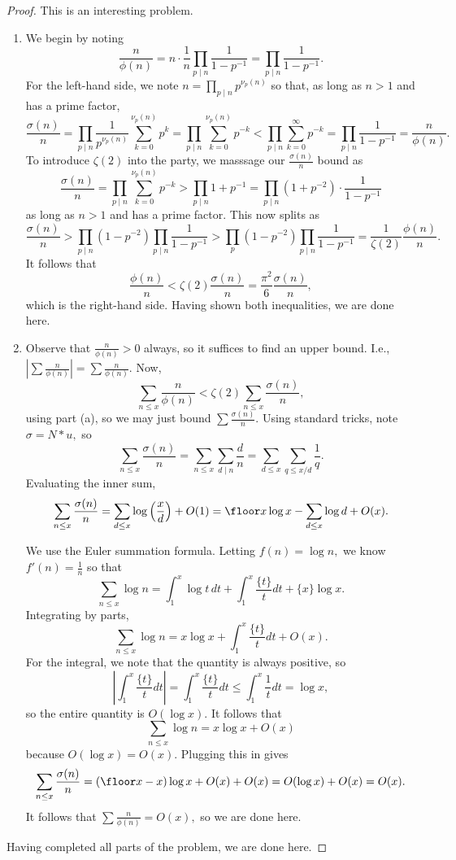 \begin{proof}
This is an interesting problem.
\begin{enumerate}[label=(\alph*)]
    \item We begin by noting
    \[\frac n{\phi(n)}=n\cdot\frac1n\prod_{p\mid n}\frac1{1-p^{-1}}=\prod_{p\mid n}\frac1{1-p^{-1}}.\]
    For the left-hand side, we note $n=\prod_{p\mid n}p^{\nu_p(n)}$ so that, as long as $n>1$ and has a prime factor,
    \[\frac{\sigma(n)}n=\prod_{p\mid n}\frac1{p^{\nu_p(n)}}\sum_{k=0}^{\nu_p(n)}p^k=\prod_{p\mid n}\sum_{k=0}^{\nu_p(n)}p^{-k}<\prod_{p\mid n}\sum_{k=0}^\infty p^{-k}=\prod_{p\mid n}\frac1{1-p^{-1}}=\frac n{\phi(n)}.\]
    To introduce $\zeta(2)$ into the party, we masssage our $\frac{\sigma(n)}n$ bound as
    \[\frac{\sigma(n)}n=\prod_{p\mid n}\sum_{k=0}^{\nu_p(n)}p^{-k}>\prod_{p\mid n}1+p^{-1}=\prod_{p\mid n}\left(1+p^{-2}\right)\cdot\frac1{1-p^{-1}}\]
    as long as $n>1$ and has a prime factor. This now splits as
    \[\frac{\sigma(n)}n>\prod_{p\mid n}\left(1-p^{-2}\right)\prod_{p\mid n}\frac1{1-p^{-1}}>\prod_p\left(1-p^{-2}\right)\prod_{p\mid n}\frac1{1-p^{-1}}=\frac1{\zeta(2)}\frac{\phi(n)}n.\]
    It follows that
    \[\frac{\phi(n)}n<\zeta(2)\frac{\sigma(n)}n=\frac{\pi^2}6\frac{\sigma(n)}n,\]
    which is the right-hand side. Having shown both inequalities, we are done here.
    \item Observe that $\frac n{\phi(n)}>0$ always, so it suffices to find an upper bound. I.e., $\left|\sum\frac n{\phi(n)}\right|=\sum\frac n{\phi(n)}.$ Now,
    \[\sum_{n\le x}\frac n{\phi(n)}<\zeta(2)\sum_{n\le x}\frac{\sigma(n)}n,\]
    using part (a), so we may just bound $\sum\frac{\sigma(n)}n.$ Using standard tricks, note $\sigma=N*u,$ so
    \[\sum_{n\le x}\frac{\sigma(n)}n=\sum_{n\le x}\sum_{d\mid n}\frac dn=\sum_{d\le x}\sum_{q\le x/d}\frac1q.\]
    Evaluating the inner sum,
    \[\sum_{n\le x}\frac{\sigma(n)}n=\sum_{d\le x}\log\left(\frac xd\right)+O(1)=\floor x\log x-\sum_{d\le x}\log d+O(x).\]
    
    We use the Euler summation formula. Letting $f(n)=\log n,$ we know $f'(n)=\frac1n$ so that
    \[\sum_{n\le x}\log n=\int_1^x\log t\,dt+\int_1^x\frac{\{t\}}tdt+\{x\}\log x.\]
    Integrating by parts,
    \[\sum_{n\le x}\log n=x\log x+\int_1^x\frac{\{t\}}tdt+O(x).\]
    For the integral, we note that the quantity is always positive, so
    \[\left|\int_1^x\frac{\{t\}}tdt\right|=\int_1^x\frac{\{t\}}tdt\le\int_1^x\frac1tdt=\log x,\]
    so the entire quantity is $O(\log x).$ It follows that
    \[\sum_{n\le x}\log n=x\log x+O(x)\]
    because $O(\log x)=O(x).$ Plugging this in gives
    \[\sum_{n\le x}\frac{\sigma(n)}n=(\floor x-x)\log x+O(x)+O(x)=O(\log x)+O(x)=O(x).\]
    It follows that $\sum\frac n{\phi(n)}=O(x),$ so we are done here.
\end{enumerate}
Having completed all parts of the problem, we are done here.
\end{proof}

